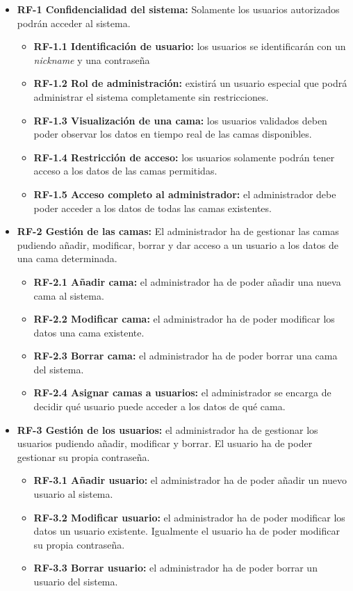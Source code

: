 \begin{itemize}
	\item \textbf{RF-1 Confidencialidad del sistema:} Solamente los usuarios autorizados podrán acceder al sistema. 
	
\begin{itemize}
		\item \textbf{RF-1.1 Identificación de usuario:} los usuarios se identificarán con un \textit{nickname} y una contraseña 
		\item \textbf{RF-1.2 Rol de administración:} existirá un usuario especial que podrá administrar el sistema completamente sin restricciones.
		\item \textbf{RF-1.3 Visualización de una cama:} los usuarios validados deben poder observar los datos en tiempo real de las camas disponibles. 
		\item \textbf{RF-1.4 Restricción de acceso:} los usuarios solamente podrán tener acceso a los datos de las camas permitidas. 
		\item \textbf{RF-1.5 Acceso completo al administrador:} el administrador debe poder acceder a los datos de todas las camas existentes.
\end{itemize}
	
	\item \textbf{RF-2 Gestión de las camas:} El administrador ha de gestionar las camas pudiendo añadir, modificar, borrar y dar acceso a un usuario a los datos de una cama determinada. 
	
\begin{itemize}
		\item \textbf{RF-2.1 Añadir cama:} el administrador ha de poder añadir una nueva cama al sistema.
		\item \textbf{RF-2.2 Modificar cama:} el administrador ha de poder modificar los datos una cama existente.
		\item \textbf{RF-2.3 Borrar cama:} el administrador ha de poder borrar una cama del sistema.
		\item \textbf{RF-2.4 Asignar camas a usuarios:} el administrador se encarga de decidir qué usuario puede acceder a los datos de qué cama.
\end{itemize}
	
	\item \textbf{RF-3 Gestión de los usuarios:} el administrador ha de gestionar los usuarios pudiendo añadir, modificar y borrar. El usuario ha de poder gestionar su propia contraseña. 

\begin{itemize}
		\item \textbf{RF-3.1 Añadir usuario:} el administrador ha de poder añadir un nuevo usuario al sistema.
		\item \textbf{RF-3.2 Modificar usuario:} el administrador ha de poder modificar los datos un usuario existente. Igualmente el usuario ha de poder modificar su propia contraseña. 
		\item \textbf{RF-3.3 Borrar usuario:} el administrador ha de poder borrar un usuario del sistema.
\end{itemize}


\end{itemize}
